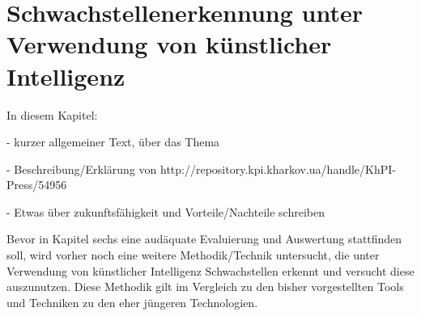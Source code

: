 \chapter{Schwachstellenerkennung unter Verwendung von künstlicher Intelligenz}

In diesem Kapitel:

- kurzer allgemeiner Text, über das Thema

- Beschreibung/Erklärung von http://repository.kpi.kharkov.ua/handle/KhPI-Press/54956

- Etwas über zukunftsfähigkeit und Vorteile/Nachteile schreiben

Bevor in Kapitel sechs eine audäquate Evaluierung und Auswertung stattfinden soll, wird vorher noch eine weitere Methodik/Technik untersucht, die unter Verwendung von künstlicher Intelligenz Schwachstellen erkennt und versucht diese auszunutzen. 
Diese Methodik gilt im Vergleich zu den bisher vorgestellten Tools und Techniken zu den eher jüngeren Technologien.





